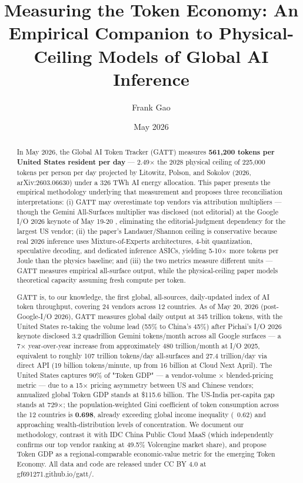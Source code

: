 \documentclass[11pt,a4paper]{article}
\title{Measuring the Token Economy: An Empirical Companion to Physical-Ceiling Models of Global AI Inference}
\author[1]{Frank Gao}
\affil[1]{Independent researcher \\ \texttt{goghxiang@gmail.com}}
\date{May 2026}
\begin{document}
\maketitle

\begin{abstract}

In May 2026, the Global AI Token Tracker (GATT) measures \textbf{561,200 tokens per United States resident per day} --- 2.49× the 2028 physical ceiling of 225,000 tokens per person per day projected by Litowitz, Polson, and Sokolov (2026, arXiv:2603.06630) under a 326 TWh AI energy allocation. This paper presents the empirical methodology underlying that measurement and proposes three reconciliation interpretations: (i) GATT may overestimate top vendors via attribution multipliers --- though the Gemini All-Surfaces multiplier was disclosed (not editorial) at the Google I/O 2026 keynote of May 19-20 \cite{pichai2026io}, eliminating the editorial-judgment dependency for the largest US vendor; (ii) the paper's Landauer/Shannon ceiling is conservative because real 2026 inference uses Mixture-of-Experts architectures, 4-bit quantization, speculative decoding, and dedicated inference ASICs, yielding 5-10× more tokens per Joule than the physics baseline; and (iii) the two metrics measure different units --- GATT measures empirical all-surface output, while the physical-ceiling paper models theoretical capacity assuming fresh compute per token.

GATT is, to our knowledge, the first global, all-sources, daily-updated index of AI token throughput, covering 24 vendors across 12 countries. As of May 20, 2026 (post-Google-I/O 2026), GATT measures global daily output at 345 trillion tokens, with the United States re-taking the volume lead (55\% to China's 45\%) after Pichai's I/O 2026 keynote disclosed 3.2 quadrillion Gemini tokens/month across all Google surfaces \cite{pichai2026io} --- a 7× year-over-year increase from approximately 480 trillion/month at I/O 2025, equivalent to roughly 107 trillion tokens/day all-surfaces and 27.4 trillion/day via direct API (19 billion tokens/minute, up from 16 billion at Cloud Next April). The United States captures 90\% of "Token GDP" --- a vendor-volume × blended-pricing metric --- due to a 15× pricing asymmetry between US and Chinese vendors; annualized global Token GDP stands at \$115.6 billion. The US-India per-capita gap stands at 729×; the population-weighted Gini coefficient of token consumption across the 12 countries is \textbf{0.698}, already exceeding global income inequality (~0.62) and approaching wealth-distribution levels of concentration. We document our methodology, contrast it with IDC China Public Cloud MaaS (which independently confirms our top vendor ranking at 49.5\% Volcengine market share), and propose Token GDP as a regional-comparable economic-value metric for the emerging Token Economy. All data and code are released under CC BY 4.0 at gf691271.github.io/gatt/.

\end{abstract}
\end{document}
